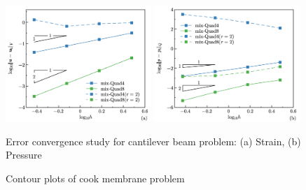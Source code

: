 \begin{figure}[H]
\centering
\includegraphics[width=0.49\textwidth]{png/cantilever_Hdev.png}
\includegraphics[width=0.49\textwidth]{png/cantilever_L2_p.png}
\caption{Error convergence study for cantilever beam problem: (a) Strain, (b) Pressure}\label{fg:cantilever_convergence}
\end{figure}


\begin{figure}[!ht]
\centering
\caption{Contour plots of cook membrane problem}\label{cook_contour}
\end{figure}

